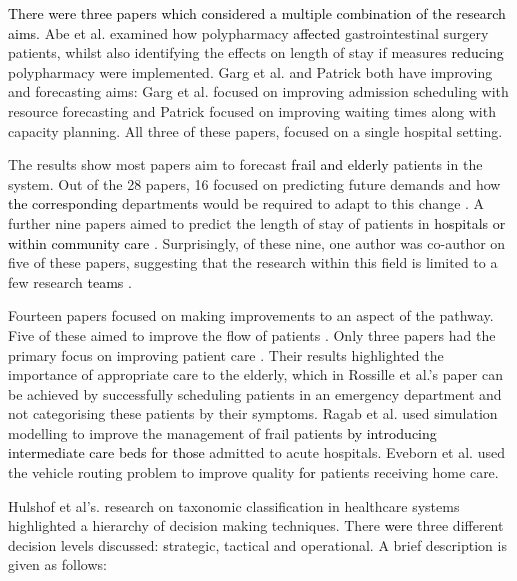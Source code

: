 \documentclass[../thesis.tex]{subfiles}
\begin{document}
\textcolor{black}{There were three papers which considered a multiple combination of the research aims.} Abe et al. \cite{Abe} examined how polypharmacy \textcolor{black}{affected} gastrointestinal surgery patients, whilst also identifying the effects on length of stay if measures \textcolor{black}{reducing} polypharmacy were implemented. Garg et al. \cite{Garg2} and Patrick \cite{Patrick} both have improving and forecasting aims: Garg et al. focused on improving admission scheduling with resource forecasting and Patrick focused on improving waiting times along with capacity planning. All three of these papers, focused on a single hospital setting.

The results show most papers aim to forecast \textcolor{black}{frail and elderly} patients in the system. Out of the 28 papers, 16 focused on predicting future demands and how \textcolor{black}{the corresponding} department\textcolor{black}{s} would be required to adapt to this change \cite{Ambagtsheer, Bae, Borowiak, Christodoulou,  Davari, Desai, Gorunescu, Grenouilleau, Hare, Johnson, Katsaliaki, YLi, Bidhandi, Patrick,Zhang1, Zhang2}. A further nine papers aimed to predict the length of stay of patients in \textcolor{black}{hospitals or within community care} \cite{Abe, Gordon2, Heggestad, Marshall1, Marshall2, Marshall3, Shaw, Taylor, Xie}. Surprisingly, of these nine, one author was co-author on five of these papers, suggesting that the research within this field is limited to a few research \textcolor{black}{teams} \cite{Gordon2, Marshall1, Marshall2, Marshall3, Shaw}.

Fourteen papers focused on making improvements to an aspect of the pathway. Five of these aimed to improve the flow of patients \cite{Chaussalet, Hamdani, Rashwan, Silvester, Trevisan}. Only three papers had the primary focus on improving patient care \cite{Eveborn, Ragab, Rossille}. Their results highlighted the importance of appropriate care to the elderly, which in Rossille et al.'s \cite{Rossille} paper can be achieved by successfully scheduling patients in an emergency department and not categorising these patients by their symptoms. Ragab et al. \cite{Ragab} used simulation modelling to improve the management of frail patients \textcolor{black}{by introducing intermediate care beds for those} admitted to acute hospitals. Eveborn et al. \cite{Eveborn} used the vehicle routing problem to improve quality \textcolor{black}{for} patients receiving home care.

Hulshof et al's. \cite{PHulshof} research on taxonomic classification in healthcare systems highlighted a hierarchy of decision making techniques. There \textcolor{black}{were} three different decision levels discussed: \textcolor{black}{s}trategic, tactical and operational. A brief description is given as follows:
\end{document}
